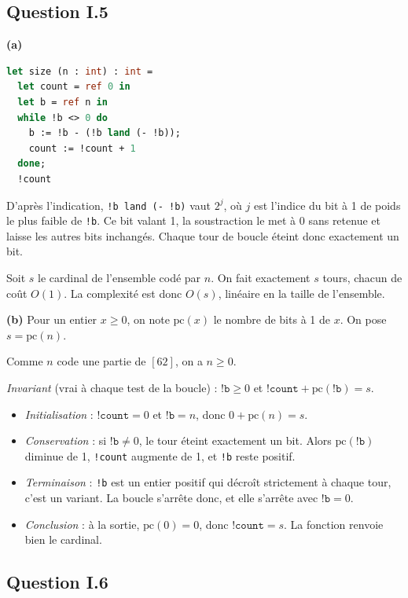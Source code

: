 \documentclass[11pt,a4paper]{article}
\providecommand{\tightlist}{\setlength{\itemsep}{0pt}\setlength{\parskip}{0pt}}
\renewcommand{\geq}{\geqslant}
\begin{document}
\hypertarget{question-i.5}{%
\subsection{Question I.5}\label{question-i.5}}

\textbf{(a)}

\begin{lstlisting}[language=Caml]
let size (n : int) : int =
  let count = ref 0 in
  let b = ref n in
  while !b <> 0 do
    b := !b - (!b land (- !b));
    count := !count + 1
  done;
  !count
\end{lstlisting}

D'après l'indication, \texttt{!b\ land\ (-\ !b)} vaut \(2^j\), où \(j\) est l'indice du bit à 1 de poids le plus faible de \texttt{!b}. Ce bit valant 1, la soustraction le met à 0 sans retenue et laisse les autres bits inchangés. Chaque tour de boucle éteint donc exactement un bit.

Soit \(s\) le cardinal de l'ensemble codé par \(n\). On fait exactement \(s\) tours, chacun de coût \(O(1)\). La complexité est donc \(\boxed{O(s)}\), linéaire en la taille de l'ensemble.

\textbf{(b)} Pour un entier \(x\geq 0\), on note \(\mathrm{pc}(x)\) le nombre de bits à 1 de \(x\). On pose \(s=\mathrm{pc}(n)\).

Comme \(n\) code une partie de \([62]\), on a \(n\geq0\).

\emph{Invariant} (vrai à chaque test de la boucle) : \(\texttt{!b}\geq 0\) et \(\texttt{!count}+\mathrm{pc}(\texttt{!b})=s\).

\begin{itemize}
\tightlist
\item
  \emph{Initialisation} : \(\texttt{!count}=0\) et \(\texttt{!b}=n\), donc \(0+\mathrm{pc}(n)=s\).
\item
  \emph{Conservation} : si \(\texttt{!b}\neq0\), le tour éteint exactement un bit. Alors \(\mathrm{pc}(\texttt{!b})\) diminue de 1, \texttt{!count} augmente de 1, et \texttt{!b} reste positif.
\item
  \emph{Terminaison} : \texttt{!b} est un entier positif qui décroît strictement à chaque tour, c'est un variant. La boucle s'arrête donc, et elle s'arrête avec \(\texttt{!b}=0\).
\item
  \emph{Conclusion} : à la sortie, \(\mathrm{pc}(0)=0\), donc \(\texttt{!count}=s\). La fonction renvoie bien le cardinal.
\end{itemize}

\hypertarget{question-i.6}{%
\subsection{Question I.6}\label{question-i.6}}
\end{document}
